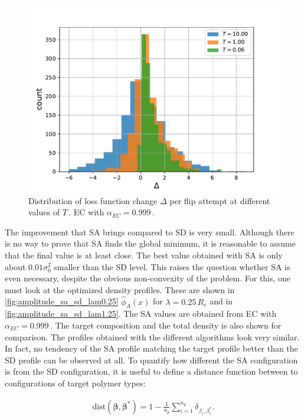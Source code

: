 \documentclass[bachelor,       %
               oneside,        %
               BCOR10mm,       %
               ngerman, english %
               ]{GAUBM}
\begin{document}
\begin{figure}[h]
    \centering
    \includegraphics[width=\textwidth]{figures/delta_loss_hist_ec.pdf}
    \caption{Distribution of loss function change $\Delta$ per flip attempt at different values of $T\,.$ \ac{EC} with $\alpha_{EC}=0.999\,.$}
    \label{fig:delta_loss_hist}
\end{figure}


The improvement that \ac{SA} brings compared to \ac{SD} is very small. Although there is no way to prove that \ac{SA} finds the global minimum, it is reasonable to assume that the final value is at least close. The best value obtained with \ac{SA} is only about $0.01\sigma_0^2$ smaller than the \ac{SD} level. This raises the question whether \ac{SA} is even necessary, despite the obvious non-convexity of the problem. For this, one must look at the optimized density profiles. These are shown in \autoref{fig:amplitude_sa_sd_lam0.25} $\hat\phi_A(x)$ for $\lambda=0.25\,R_e$ and in \autoref{fig:amplitude_sa_sd_lam1.25}. The \ac{SA} values are obtained from \ac{EC} with $\alpha_{EC}=0.999\,.$ The target composition and the total density is also shown for comparison. The profiles obtained with the different algorithms look very similar. In fact, no tendency of the \ac{SA} profile matching the target profile better than the \ac{SD} profile can be observed at all. To quantify how different the \ac{SA} configuration is from the \ac{SD} configuration, it is useful to define a distance function between to configurations of target polymer types:

\begin{align}
    \mathrm{dist}(\pmb\beta,\pmb\beta^*)=1-\frac{1}{n_p}\sum_{i=1}^{n_p}\delta_{\beta_i,\beta_i^*}.
\end{align}
\end{document}
